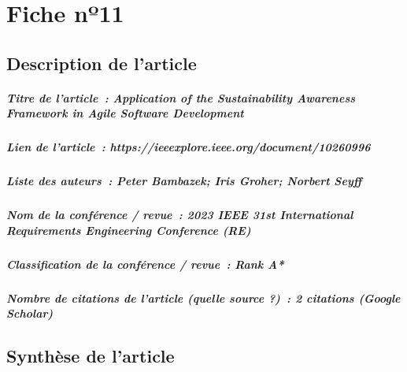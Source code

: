 
\chapter{Fiche nº11} %
\label{app:Fiche11} %

\section{Description de l'article}

\paragraph{Titre de l'article~: \textnormal{Application of the Sustainability Awareness Framework in Agile Software Development}}
\paragraph{Lien de l'article~: \textnormal{https://ieeexplore.ieee.org/document/10260996}}
\paragraph{Liste des auteurs~: \textnormal{Peter Bambazek; Iris Groher; Norbert Seyff}}
\paragraph{Nom de la conférence / revue~: \textnormal{2023 IEEE 31st International Requirements Engineering Conference (RE)}}
\paragraph{Classification de la conférence / revue~: \textnormal{Rank A*}}
\paragraph{Nombre de citations de l'article (quelle source ?)~: \textnormal{2 citations (Google Scholar)}}



\section{Synthèse de l'article}

